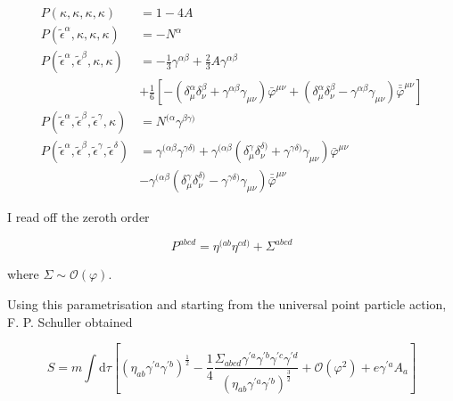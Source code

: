 \documentclass[11pt]{article}
\begin{document}
\begin{align}
	P \left( \kappa, \kappa, \kappa, \kappa \right)
	&= 1 - 4A  \label{p0000} \\
	P \left( \tilde{\epsilon}^\alpha, \kappa, \kappa, \kappa \right)
	&= - N^\alpha \\
	P \left( \tilde{\epsilon}^\alpha, \tilde{\epsilon}^\beta, \kappa, \kappa \right)
	&= - \frac{1}{3} \gamma^{\alpha \beta}
	+ \frac{2}{3} A \gamma^{\alpha \beta} \\
	&+ \frac{1}{6} 
	\left[
		- 
		\left( 
			\delta^\alpha_\mu \delta^\beta_\nu 
			+ \gamma^{\alpha \beta} \gamma_{\mu \nu} 
		\right)
		\bar{\varphi}^{\mu \nu}
		+
		\left( 
			\delta^\alpha_\mu \delta^\beta_\nu 
			- \gamma^{\alpha \beta} \gamma_{\mu \nu} 
		\right)
		\bar{\bar{\varphi}}^{\mu \nu}
	\right] \\
	P \left( \tilde{\epsilon}^\alpha, \tilde{\epsilon}^\beta, \tilde{\epsilon}^\gamma, \kappa \right)
	&= N^{( \alpha}\gamma^{\beta \gamma )}\\
	P \left( \tilde{\epsilon}^\alpha, \tilde{\epsilon}^\beta, \tilde{\epsilon}^\gamma, \tilde{\epsilon}^\delta \right)
	&= \gamma^{( \alpha \beta} \gamma^{\gamma \delta )}
	+ 
	\gamma^{( \alpha \beta}
	\left( 
		\delta^\gamma_\mu \delta^{\delta ) }_\nu 
		+ \gamma^{\gamma \delta ) } \gamma_{\mu \nu} 
	\right)
	\bar{\varphi}^{\mu \nu} \\
	&- 
	\gamma^{( \alpha \beta}
	\left( 
		\delta^\gamma_\mu \delta^{\delta ) }_\nu 
		- \gamma^{\gamma \delta ) } \gamma_{\mu \nu} 
	\right)
	\bar{\bar{\varphi}}^{\mu \nu} \label{pabcd}
\end{align}

I read off the zeroth order

\begin{equation}
	P^{a b c d} = \eta^{ ( a b } \eta^{ c d )} + \Sigma^{ a b c d}
\end{equation}

where $\Sigma \sim \mathcal{O} \left( \varphi \right)$.

Using this parametrisation and starting from the universal point particle action, F. P. Schuller obtained

\begin{equation}
	S = 
	m \int \mathrm{d} \tau 
	\left[
		\left( 
			\eta_{a b} \gamma^{\prime a} \gamma^{\prime b} 
		\right)^{\frac{1}{2}}
	 -
	 \frac{1}{4}
	 \frac{
	 \Sigma_{a b c d}
	 \gamma^{\prime a} \gamma^{\prime b} \gamma^{\prime c} \gamma^{\prime d}
	 }{\left( 
			\eta_{a b} \gamma^{\prime a} \gamma^{\prime b} 
		\right)^{\frac{3}{2}}}
		+
		\mathcal{O} \left( \varphi^2 \right)
		+ e \gamma^{\prime a} A_a
	\right]
\end{equation}
\end{document}
